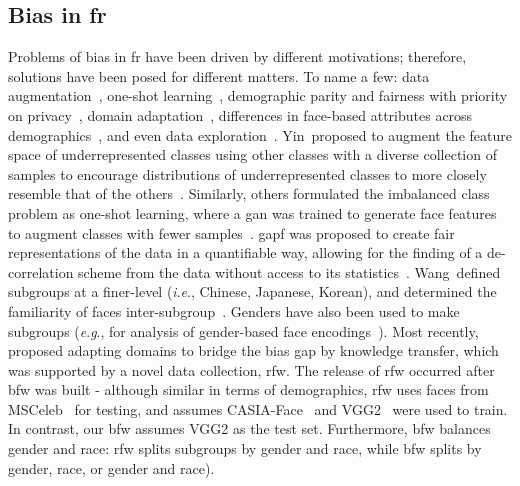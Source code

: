 \documentclass[10pt,twocolumn,letterpaper]{article}
\newcommand{\ie}{\textit{i}.\textit{e}., }
\newcommand{\eg}{\textit{e}.\textit{g}., }
\begin{document}
    \subsection{Bias in \gls{fr}}
        Problems of bias in \gls{fr} have been driven by different motivations; therefore, solutions have been posed for different matters. To name a few: data augmentation~\cite{yin2019feature}, one-shot learning~\cite{ding2018one}, demographic parity and fairness with priority on privacy~\cite{huang2018generative}, domain adaptation~\cite{wang2018racial}, differences in face-based attributes across demographics~\cite{wang2018they}, and even data exploration~\cite{muthukumar2019}. Yin~\etal proposed to augment the feature space of underrepresented classes using other classes with a diverse collection of samples to encourage distributions of underrepresented classes to more closely resemble that of the others~\cite{yin2019feature}. Similarly, others formulated the imbalanced class problem as one-shot learning, where a \gls{gan} was trained to generate face features to augment classes with fewer samples~\cite{ding2018one}. \gls{gapf} was proposed to create fair representations of the data in a quantifiable way, allowing for the finding of a de-correlation scheme from the data without access to its statistics~\cite{huang2018generative}. Wang~\etal defined subgroups at a finer-level (\ie Chinese, Japanese, Korean), and determined the familiarity of faces inter-subgroup~\cite{wang2018they}. Genders have also been used to make subgroups (\eg for analysis of gender-based face encodings~\cite{muthukumar2019}). Most recently,~\cite{wang2018racial} proposed adapting domains to bridge the bias gap by knowledge transfer, which was supported by a novel data collection, \gls{rfw}. The release of \gls{rfw} occurred after \gls{bfw} was built - although similar in terms of demographics, \gls{rfw} uses faces from MSCeleb~\cite{guo2016ms} for testing, and assumes CASIA-Face~\cite{yi2014learning} and VGG2~\cite{Cao18} were used to train. In contrast, our \gls{bfw} assumes VGG2 as the test set. 
        Furthermore, \gls{bfw} balances gender and race: \gls{rfw} splits subgroups by gender and race, while \gls{bfw} splits by gender, race, or gender and race). 
\end{document}
